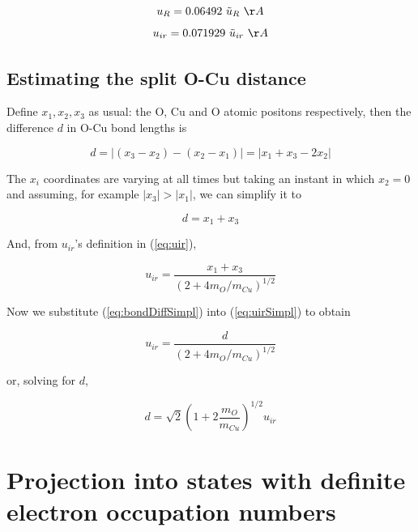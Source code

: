 \begin{equation}\label{eq:uRvstildeuR}
u_R = 0.06492\ \tilde{u}_R\ \AA
\end{equation}
\begin{equation}\label{eq:uirvstildeuir}
u_{ir} = 0.071929\ \tilde{u}_{ir}\ \AA
\end{equation}


\subsection{Estimating the split O-Cu distance}

Define $x_1,x_2,x_3$ as usual: the O, Cu and O atomic positons respectively, then the difference $d$ in O-Cu bond lengths is

\begin{equation}\label{eq:bondDiff}
d= \left| (x_3 - x_2) - (x_2 - x_1) \right| = \left| x_1 + x_3 - 2x_2 \right|
\end{equation}

The $x_i$ coordinates are varying at all times but taking an instant in which $x_2=0$ and assuming, for example $|x_3|>|x_1|$, we can simplify it to

\begin{equation}\label{eq:bondDiffSimpl}
d=x_1+x_3
\end{equation}

And, from $u_{ir}$'s definition in (\ref{eq:uir}),

\begin{equation}\label{eq:uirSimpl}
u_{ir}=\frac{x_1+x_3}{\left( 2+4 m_O/m_{Cu} \right)^{1/2}}
\end{equation}

Now we substitute (\ref{eq:bondDiffSimpl}) into (\ref{eq:uirSimpl}) to obtain

\begin{equation}\label{eq:uirvsd}
u_{ir}=\frac{d}{\left( 2+4 m_O/m_{Cu} \right)^{1/2}}
\end{equation}

or, solving for $d$,

\begin{equation}\label{eq:dvsuir}
d=\sqrt{2}\left(1 + 2\frac{m_O}{m_{Cu}} \right)^{1/2}u_{ir}
\end{equation}


\section{Projection into states with definite electron occupation numbers}

